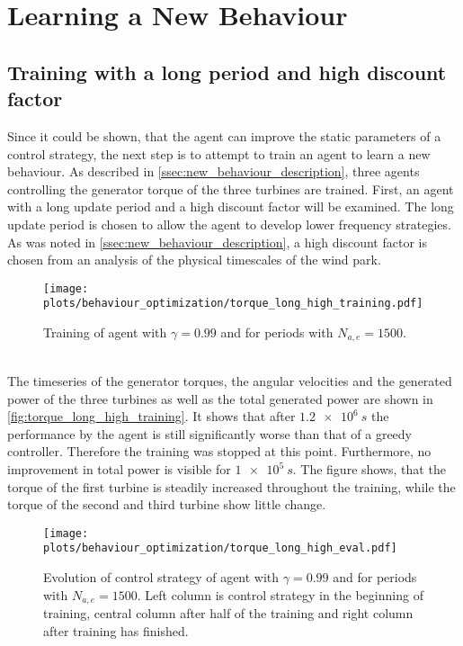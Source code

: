 \section{Learning a New Behaviour}
\subsection{Training with a long period and high discount factor}
Since it could be shown, that the agent can improve the static parameters of a control strategy, the next step is to attempt to train an agent to learn a new behaviour. As described in \ref{ssec:new_behaviour_description}, three agents controlling the generator torque of the three turbines are trained. First, an agent with a long update period and a high discount factor will be examined. The long update period is chosen to allow the agent to develop lower frequency strategies. As was noted in \autoref{ssec:new_behaviour_description}, a high discount factor is chosen from an analysis of the physical timescales of the wind park.
\begin{figure}[h]
	\texttt{[image: plots/behaviour\_optimization/torque\_long\_high\_training.pdf]}
	\caption{ Training of agent with $\gamma=0.99$ and for periods with $N_{a,e}=1500$.}
	\label{fig:torque_long_high_training}
\end{figure}\\
The timeseries of the generator torques, the angular velocities and the generated power of the three turbines as well as the total generated power are shown in \autoref{fig:torque_long_high_training}. It shows that after $\SI{1.2e6}{s}$ the performance by the agent is still significantly worse than that of a greedy controller. Therefore the training was stopped at this point. Furthermore, no improvement in total power is visible for $\SI{1e5}{s}$. The figure shows, that the torque of the first turbine is steadily increased throughout the training, while the torque of the second and third turbine show little change.
\begin{figure}[h]
	\texttt{[image: plots/behaviour\_optimization/torque\_long\_high\_eval.pdf]}
	\caption{Evolution of control strategy of agent with $\gamma=0.99$ and for periods with $N_{a,e}=1500$. Left column is control strategy in the beginning of training, central column after half of the training and right column after training has finished.}
	\label{fig:torque_long_high_eval}
\end{figure} \\
